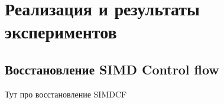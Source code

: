 \chapter{Реализация и результаты экспериментов}\label{ch:results}

\section{Восстановление SIMD Control flow}\label{sec:results/simdcf}

Тут про восстановление SIMDCF

